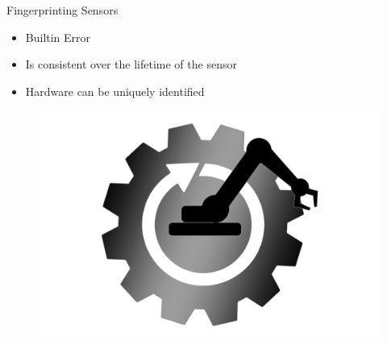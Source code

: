 \documentclass[aspectratio=169]{beamer}
[aspectratio=169] %
\begin{document}
\begin{frame}{Fingerprinting Sensors}
  \begin{minipage}{0.49\textwidth} 
    \begin{itemize}
      \item Builtin Error
      \item Is consistent over the lifetime of the sensor
      \item Hardware can be uniquely identified
    \end{itemize}
  \end{minipage}
  \hfill
  \begin{minipage}{0.49\textwidth} 
    \begin{figure}
      \centering
      \includegraphics[height=0.5\textheight]{figures/machine.png}
    \end{figure}
  \end{minipage}
\end{frame}
\end{document}
